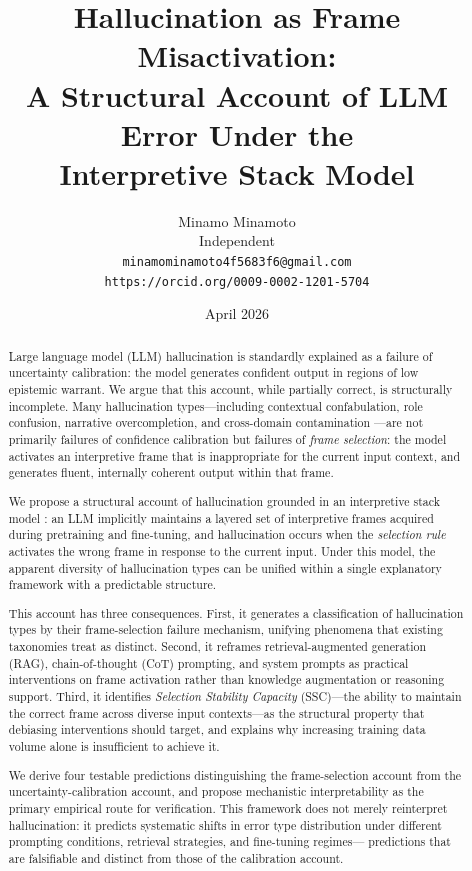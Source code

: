 \documentclass[12pt]{article}
\title{Hallucination as Frame Misactivation:\\
A Structural Account of LLM Error Under the\\
Interpretive Stack Model}
\author{Minamo Minamoto\\
\small Independent\\
\small \texttt{minamominamoto4f5683f6@gmail.com}\\
\small \texttt{https://orcid.org/0009-0002-1201-5704}}
\date{April 2026}
\begin{document}
\maketitle

\begin{abstract}
Large language model (LLM) hallucination is standardly explained as
a failure of uncertainty calibration: the model generates confident
output in regions of low epistemic warrant. We argue that this
account, while partially correct, is structurally incomplete. Many
hallucination types---including contextual confabulation, role
confusion, narrative overcompletion, and cross-domain contamination
---are not primarily failures of confidence calibration but failures
of \emph{frame selection}: the model activates an interpretive frame
that is inappropriate for the current input context, and generates
fluent, internally coherent output within that frame.

We propose a structural account of hallucination grounded in an
interpretive stack model \cite{minamoto2026accumulation}: an LLM implicitly maintains a layered set of
interpretive frames acquired during pretraining and fine-tuning,
and hallucination occurs when the \emph{selection rule} activates
the wrong frame in response to the current input. Under this model,
the apparent diversity of hallucination types can be unified within
a single explanatory framework with a predictable structure.

This account has three consequences. First, it generates a
classification of hallucination types by their frame-selection
failure mechanism, unifying phenomena that existing taxonomies treat
as distinct. Second, it reframes retrieval-augmented generation (RAG),
chain-of-thought (CoT) prompting, and system prompts as practical
interventions on frame activation rather than knowledge augmentation
or reasoning support. Third, it identifies \emph{Selection Stability
Capacity} (SSC)---the ability to maintain the correct frame across
diverse input contexts---as the structural property that debiasing
interventions should target, and explains why increasing training
data volume alone is insufficient to achieve it.

We derive four testable predictions distinguishing the frame-selection
account from the uncertainty-calibration account, and propose
mechanistic interpretability as the primary empirical route for
verification. This framework does not merely reinterpret hallucination:
it predicts systematic shifts in error type distribution under different
prompting conditions, retrieval strategies, and fine-tuning regimes---
predictions that are falsifiable and distinct from those of the
calibration account.
\end{abstract}
\end{document}
